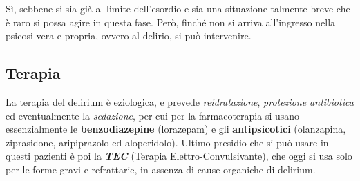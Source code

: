 Sì, sebbene si sia già al limite dell'esordio e sia una situazione
talmente breve che è raro si possa agire in questa fase. Però, finché
non si arriva all'ingresso nella psicosi vera e propria, ovvero al
delirio, si può intervenire.

\subsection{Terapia}

La terapia del delirium è eziologica, e prevede \emph{reidratazione},
\emph{protezione antibiotica} ed eventualmente la \emph{sedazione}, per
cui per la farmacoterapia si usano essenzialmente le
\textbf{benzodiazepine} (lorazepam) e gli \textbf{antipsicotici}
(olanzapina, ziprasidone, aripiprazolo ed aloperidolo). Ultimo presidio
che si può usare in questi pazienti è poi la \textbf{\emph{TEC}}
(Terapia Elettro-Convulsivante), che oggi si usa solo per le forme gravi
e refrattarie, in assenza di cause organiche di delirium.

